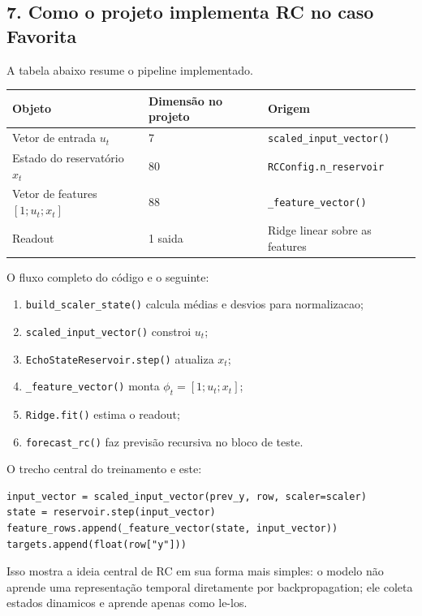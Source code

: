 \documentclass[12pt]{article}
\providecommand{\tightlist}{%
          \setlength{\itemsep}{0pt}\setlength{\parskip}{0pt}}
\begin{document}
\subsection{7. Como o projeto implementa RC no caso Favorita}\label{7-como-o-projeto-implementa-rc-no-caso-favorita}

A tabela abaixo resume o pipeline implementado.

\begin{longtable}[]{@{}lll@{}}
\toprule\noalign{}
Objeto & Dimensão no projeto & Origem \\
\midrule\noalign{}
\endhead
\bottomrule\noalign{}
\endlastfoot
Vetor de entrada \(u_t\) & 7 & \texttt{scaled\_input\_vector()} \\
Estado do reservatório \(x_t\) & 80 & \texttt{RCConfig.n\_reservoir} \\
Vetor de features \([1; u_t; x_t]\) & 88 & \texttt{\_feature\_vector()} \\
Readout & 1 saida & Ridge linear sobre as features \\
\end{longtable}

O fluxo completo do código e o seguinte:

\begin{enumerate}
\def\labelenumi{\arabic{enumi}.}
\tightlist
\item
  \texttt{build\_scaler\_state()} calcula médias e desvios para normalizacao;
\item
  \texttt{scaled\_input\_vector()} constroi \(u_t\);
\item
  \texttt{EchoStateReservoir.step()} atualiza \(x_t\);
\item
  \texttt{\_feature\_vector()} monta \(\phi_t = [1; u_t; x_t]\);
\item
  \texttt{Ridge.fit()} estima o readout;
\item
  \texttt{forecast\_rc()} faz previsão recursiva no bloco de teste.
\end{enumerate}

O trecho central do treinamento e este:

\begin{verbatim}
input_vector = scaled_input_vector(prev_y, row, scaler=scaler)
state = reservoir.step(input_vector)
feature_rows.append(_feature_vector(state, input_vector))
targets.append(float(row["y"]))
\end{verbatim}

Isso mostra a ideia central de RC em sua forma mais simples: o modelo não aprende uma representação temporal diretamente por backpropagation; ele coleta estados dinamicos e aprende apenas como le-los.
\end{document}
